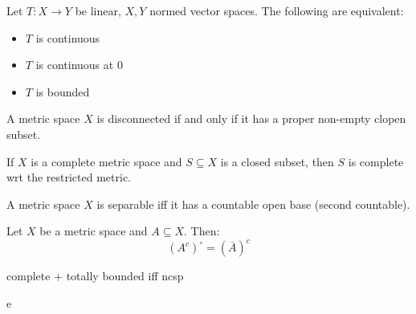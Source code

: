 \documentclass{article}
\begin{document}
\setcounter{subsection}{1}

\begin{thm}
    Let $ T: X \rightarrow Y $ be linear, $ X, Y $ normed vector spaces.
    The following are equivalent:
    \begin{itemize}
        \item $ T $ is continuous
        \item $ T $ is continuous at $ 0 $
        \item $ T $ is bounded
    \end{itemize}
\end{thm}

\begin{thm}
    A metric space $ X $ is disconnected if and only if it has a proper non-empty clopen subset.
\end{thm}

\begin{thm}
    If $ X $ is a complete metric space and $ S \subseteq X $ is a closed subset, then
    $ S $ is complete wrt the restricted metric.
\end{thm}

\begin{thm}
    A metric space $ X $ is separable iff it has a countable open base (second countable).
\end{thm}

\begin{thm}
    Let $ X $ be a metric space and $ A \subseteq X $. Then:
    \begin{equation*}
        (A^{c})^{\circ} = (\overline{A})^{c}
    \end{equation*}
\end{thm}

\begin{thm}
    complete + totally bounded iff ncsp
\end{thm}

e
\end{document}
